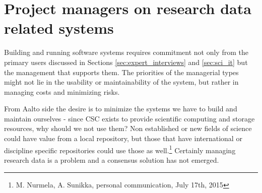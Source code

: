 \section{Project managers on research data related systems}

Building and running software systems requires commitment not only from the
primary users discussed in Sections \ref{sec:expert_interviews} and
\ref{sec:sci_it} but the management that supports them. The priorities of the
managerial types might not lie in the usability or maintainability of the
system, but rather in managing costs and minimizing risks.

From Aalto side the desire is to minimize the systems we have to build and
maintain ourselves - since CSC exists to provide scientific computing and
storage resources, why should we not use them? Non established or new fields
of science could have value from a local repository, but those that have
international or discipline specific repositories could use those as well.\footnote{M. Nurmela, A. Sunikka, personal communication, July 17th, 2015}
Certainly managing research data is a problem and a consensus solution has not
emerged.

